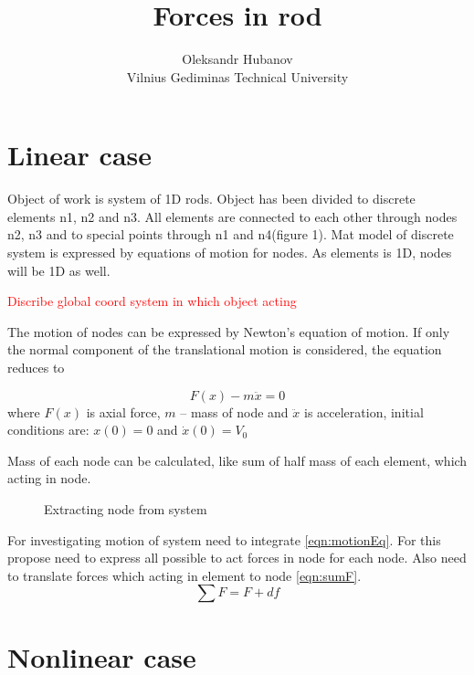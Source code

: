 \documentclass[12pt]{article}
\begin{document}
\title{Forces in rod}
\author{Oleksandr Hubanov\\
Vilnius Gediminas Technical University}
\maketitle
\section {Linear case}
Object of work is system of 1D rods. Object has been divided to discrete elements n1, n2 and n3.
All elements are connected to each other through nodes n2, n3 and to special points through n1 and n4(figure 1).
Mat model of discrete system is expressed by equations of motion for nodes. As elements is 1D, nodes will be 1D as well. \par
\textcolor{red}{Discribe global coord system in which object acting} \par
The motion of nodes can be expressed by Newton's equation of motion. If only the normal component of the translational
motion is considered, the equation reduces to\par
\begin{equation}\label{eqn:motionEq}
   F(x)-m\ddot{x}=0
\end{equation}
where $F(x)$ is axial force, $m$ – mass of node and $\ddot{x}$ is acceleration, initial conditions are: $x(0)=0$ and $\dot{x}(0)=V_0$\par
Mass of each node can be calculated, like sum of half mass of each element, which acting in node.\par
\begin{figure}[h]
  \centering
      
  \caption{Extracting node from system}    
\end{figure}
For investigating motion of system need to integrate \eqref{eqn:motionEq}. For this propose need to express all possible to act forces in node for each node.
Also need to translate forces which acting in element to node \eqref{eqn:sumF}. 
\begin{equation}\label{eqn:sumF}
   \sum F=F + df
\end{equation}

\pagebreak

\section {Nonlinear case}
\end{document}
